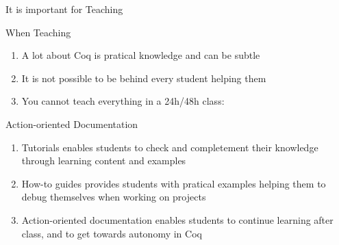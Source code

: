 \documentclass[10pt]{beamer}
\begin{document}
\begin{frame}{It is important for Teaching}
  \begin{tcbProp}{When Teaching}
    \begin{enumerate}
      \item<1-> A lot about Coq is pratical knowledge and can be subtle
      \item<2-> It is not possible to be behind every student helping them
      \item<3-> You cannot teach everything in a 24h/48h class:
    \end{enumerate}
  \end{tcbProp}
  \begin{tcbSol}{Action-oriented Documentation}
    \begin{enumerate}
      \item<5-> Tutorials enables students to check and completement their knowledge
            through learning content and examples
      \item<6-> How-to guides provides students with pratical examples helping them
            to debug themselves when working on projects
      \item<7-> Action-oriented documentation enables students to continue
            learning after class, and to get towards autonomy in Coq
    \end{enumerate}
  \end{tcbSol}
\end{frame}
\end{document}
